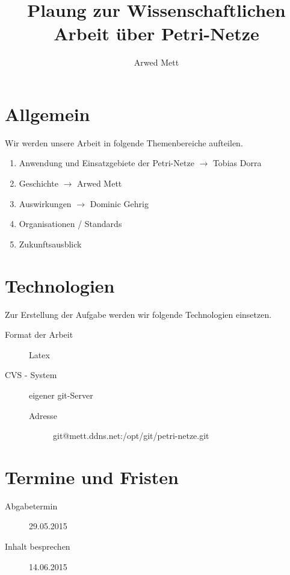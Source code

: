 \documentclass{article}
\title{Plaung zur Wissenschaftlichen Arbeit über Petri-Netze}
\author{Arwed Mett}
\begin{document}
\maketitle

\section{Allgemein}
Wir werden unsere Arbeit in folgende Themenbereiche aufteilen.
\begin{enumerate}
    \item Anwendung und Einsatzgebiete der Petri-Netze $\rightarrow$ Tobias Dorra
    \item Geschichte $\rightarrow$ Arwed Mett
    \item Auswirkungen $\rightarrow$ Dominic Gehrig
    \item Organisationen / Standards
    \item Zukunftsausblick
\end{enumerate}

\section{Technologien}
Zur Erstellung der Aufgabe werden wir folgende Technologien einsetzen.
\begin{description}
    \item[Format der Arbeit] Latex
    \item[CVS - System] eigener git-Server
        \begin{description}
            \item[Adresse] git@mett.ddns.net:/opt/git/petri-netze.git
        \end{description}
\end{description}

\section{Termine und Fristen}
\begin{description}
    \item[Abgabetermin] 29.05.2015
    \item[Inhalt besprechen] 14.06.2015
\end{description}
\end{document}
